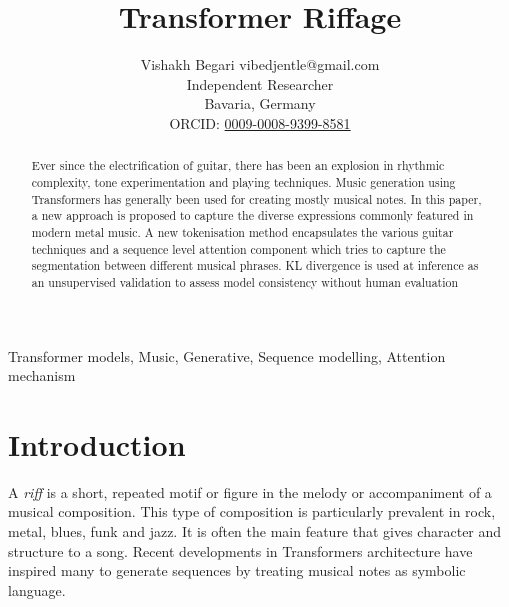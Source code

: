 \documentclass[twoside,11pt]{article}
\begin{document}
\title{Transformer Riffage}

\author{\name Vishakh Begari \email vibedjentle@gmail.com \\
       \addr Independent Researcher\\
       Bavaria, Germany\\
       ORCID: \href{https://orcid.org/0009-0008-9399-8581}{0009-0008-9399-8581}}


\maketitle

\begin{abstract}%
Ever since the electrification of guitar, there has been an explosion 
in rhythmic complexity, tone experimentation and playing techniques. Music 
generation using Transformers \cite{Vaswani2} has generally 
been used for creating mostly musical notes. In this paper, a new approach is proposed 
to capture the diverse expressions commonly featured in modern metal music. 
A new tokenisation method encapsulates the various guitar techniques and a sequence level attention component 
which tries to capture the segmentation between different musical phrases.
KL divergence is used at inference as an unsupervised validation to assess model consistency without human evaluation
\end{abstract}

\begin{keywords}
  Transformer models, Music, Generative, Sequence modelling, Attention mechanism
\end{keywords}

\section{Introduction}
A \textit{riff} is a short, repeated motif or figure in the melody or accompaniment of a 
musical composition. \cite{randel:86} This type of composition is particularly prevalent 
in rock, metal, blues, funk and jazz. It is often the main feature that gives character 
and structure to a song. Recent developments in Transformers architecture have inspired 
many to generate sequences by treating musical notes as symbolic language. 
\end{document}
